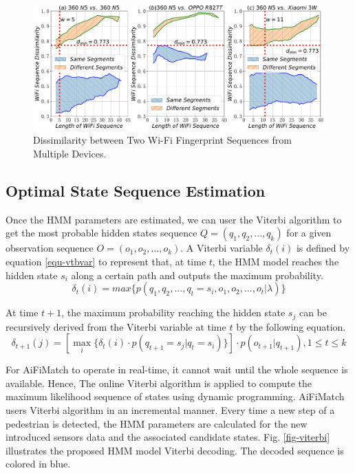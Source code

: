 \documentclass{llncs}
\begin{document}
\vspace{-10pt}
\begin{figure}[!htbp]
	\centering
	\includegraphics[width=4.94in]{AiFiMatch-WiFiJCD}
	\caption{Dissimilarity between Two Wi-Fi Fingerprint Sequences from Multiple Devices.}
	\label{fig-wifidist}
\end{figure}
\vspace{-20pt}

\subsection{Optimal State Sequence Estimation}

Once the HMM parameters are estimated, we can user the Viterbi algorithm to get the most probable hidden states sequence $Q = ({q_1},{q_2},...,{q_k})$ for a given observation sequence $O = ({o_1},{o_2},...,{o_k})$. A Viterbi variable ${\delta _t}(i)$ is defined by equation \ref{equ-vtbvar} to represent that, at time $t$, the HMM model reaches the hidden state $s_i$ along a certain path and outputs the maximum probability.
\begin{equation}
	\label{equ-vtbvar}
	{\delta _t}(i) = max\{ p({q_1},{q_2},...,{q_t} = {s_i},{o_1},{o_2},...,{o_t}|\lambda )\}
\end{equation}

At time $t+1$, the maximum probability reaching the hidden state $s_j$ can be recursively derived from the Viterbi variable at time $t$ by the following equation. 
\begin{equation}
	{\delta _{t + 1}}(j) = [\mathop {max}\limits_i \{ {\delta _t}(i) \cdot p({q_{t + 1}} = {s_j}|{q_t} = {s_i})\} ] \cdot p({o_{t + 1}}|{q_{t + 1}}),1 \le t \le k
\end{equation}

For AiFiMatch to operate in real-time, it cannot wait until the whole sequence is available. Hence, The online Viterbi algorithm \cite{bloit2008short} is applied to compute the maximum likelihood sequence of states using dynamic programming. AiFiMatch users Viterbi algorithm in an incremental manner. Every time a new step of a pedestrian is detected, the HMM parameters are calculated for the new introduced sensors data and the associated candidate states.  Fig. \ref{fig-viterbi} illustrates the proposed HMM model Viterbi decoding. The decoded sequence is colored in blue.
\end{document}
